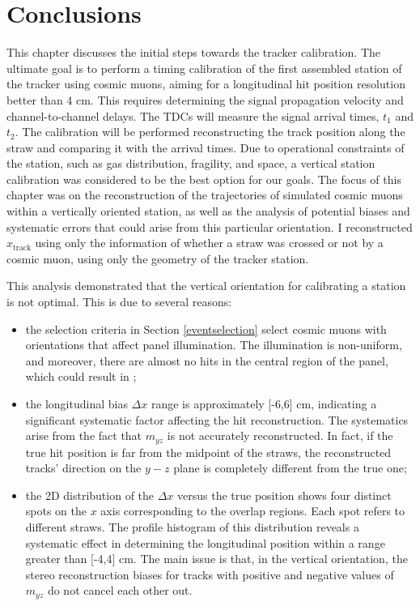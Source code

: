   \section{Conclusions}
  This chapter discusses the initial steps towards the tracker calibration.
  The ultimate goal is to perform a timing calibration of 
  the first assembled station of the tracker using cosmic muons, aiming for a longitudinal hit 
  position resolution better than 4 cm. This requires determining the signal propagation velocity and 
  channel-to-channel delays. The TDCs will measure the signal arrival times, $t_1$ and $t_2$. 
  The calibration will be performed reconstructing the track position along the straw and comparing it with the arrival times. 
  Due to operational constraints of the station, such as gas distribution, fragility, and space, a 
  vertical station calibration was considered to be the best option for our goals.
  The focus of this chapter was on the reconstruction of the trajectories 
  of simulated cosmic muons within a vertically oriented station, as well as the 
  analysis of potential biases and systematic errors that could arise from this particular orientation. 
  I reconstructed $x_{\text{track}}$ using only the information of whether a straw was crossed 
  or not by a cosmic muon, using only the geometry of the tracker station.

This analysis demonstrated that the vertical orientation for calibrating a station is not optimal. This is due to several reasons:
\begin{itemize}
    \item the selection criteria in Section \ref{eventselection} select cosmic muons with orientations that affect panel illumination. 
      The illumination is non-uniform, and moreover, there are almost no hits in the central region of the panel, which could result in ;

    \item the longitudinal bias $\Delta x$ range is approximately [-6,6] cm, indicating a significant systematic factor 
    affecting the hit reconstruction. The systematics arise from the fact that $m_{yz}$ is not accurately reconstructed.
    In fact, if the true hit position is far from the midpoint of the straws, the reconstructed tracks'
    direction on the $y-z$ plane is completely different from the true one;
    \item the 2D distribution of the $\Delta x$ versus the true position shows 
    four distinct spots on the $x$ axis corresponding to the overlap regions. Each spot refers to different straws. 
    The profile histogram of this distribution reveals a systematic effect in determining the 
    longitudinal position within a range greater than [-4,4] cm. The main issue is that, in the vertical orientation, the stereo 
    reconstruction biases for tracks with positive and negative values of $m_{yz}$ do not cancel each other out.
\end{itemize}

